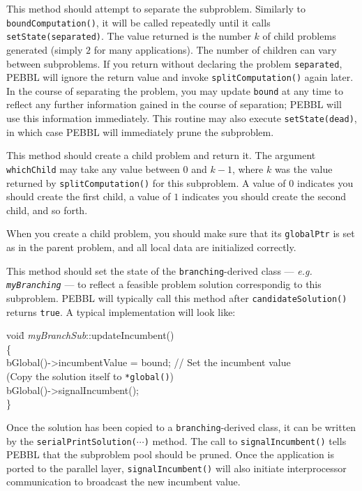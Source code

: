 This method should attempt to separate the subproblem.  Similarly to
\texttt{boundComputation()}, it will be called repeatedly until it
calls \texttt{setState(separated)}.  The value returned is the number $k$
of child problems generated (simply $2$ for many applications).  The
number of children can vary between subproblems.
If you return without declaring the problem \texttt{separated}, PEBBL
will ignore the return value and invoke \texttt{splitComputation()}
again later.  In the course of separating the problem, you may update
\texttt{bound} at any time to reflect any further information gained
in the course of separation; PEBBL will use this
information immediately.  This routine may also execute
\texttt{setState(dead)}, in which case PEBBL will immediately prune
the subproblem.


This method should create a child problem and return it.  The argument
\texttt{whichChild} may take any value between $0$ and $k-1$, where $k$
was the value returned by \texttt{splitComputation()} for this
subproblem.  
A value of $0$ indicates you should create the first child, a
value of $1$ indicates you should create the second child, and so
forth.  

When you create a child problem, you should make sure that its
\texttt{globalPtr} is set as in the parent problem, and all local
data are initialized correctly.


This method should set the state of the \texttt{branching}-derived
class --- \emph{e.g. \texttt{myBranching}} --- to reflect a feasible
problem solution correspondig to this 
subproblem.  PEBBL will typically call this method
after \texttt{candidateSolution()} returns \texttt{true}.  A typical
implementation will look like:
\begin{codeblock}
voi\=d \emph{myBranchSub}::updateIncumbent() \\
\{\\
\>bGlobal()->incumbentValue = bound;  // Set the incumbent value \\
\>\textrm{(Copy the solution itself to \texttt{*global()})} \\
\>bGlobal()->signalIncumbent(); \\
\}
\end{codeblock}
Once the solution has been copied to a \texttt{branching}-derived
class, it can be written by the \texttt{serialPrintSolution($\cdots$)}
method.  The call to \texttt{signalIncumbent()} tells PEBBL that
the subproblem pool should be pruned.  Once the application is ported
to the parallel layer, \texttt{signalIncumbent()} will also initiate
interprocessor communication to broadcast the new incumbent value.


